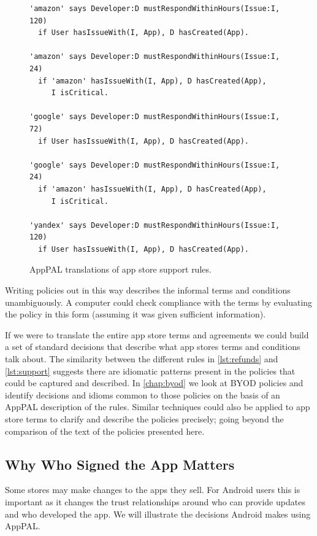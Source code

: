 \documentclass[thesis.tex]{subfiles}
\begin{document}
\begin{figure}\centering
  \begin{lstlisting}
'amazon' says Developer:D mustRespondWithinHours(Issue:I, 120)
  if User hasIssueWith(I, App), D hasCreated(App).

'amazon' says Developer:D mustRespondWithinHours(Issue:I, 24)
  if 'amazon' hasIssueWith(I, App), D hasCreated(App),
     I isCritical.
     
'google' says Developer:D mustRespondWithinHours(Issue:I, 72)
  if User hasIssueWith(I, App), D hasCreated(App).

'google' says Developer:D mustRespondWithinHours(Issue:I, 24)
  if 'amazon' hasIssueWith(I, App), D hasCreated(App),
     I isCritical.

'yandex' says Developer:D mustRespondWithinHours(Issue:I, 120)
  if User hasIssueWith(I, App), D hasCreated(App).
  \end{lstlisting}
  \caption{AppPAL translations of app store support rules.}
  \label{lst:support}
\end{figure}

Writing policies out in this way describes the informal terms and conditions
unambiguously. A computer could check compliance with the terms by evaluating
the policy in this form (assuming it was given sufficient information).

If we were to translate the entire app store terms and agreements we could build
a set of standard decisions that describe what app stores terms and conditions
talk about. The similarity between the different rules in \autoref{lst:refunds}
and \autoref{lst:support} suggests there are idiomatic patterns present in the
policies that could be captured and described. In \autoref{chap:byod} we look at
BYOD policies and identify decisions and idioms common to those policies on the
basis of an AppPAL description of the rules. Similar techniques could also be
applied to app store terms to clarify and describe the policies precisely; going
beyond the comparison of the text of the policies presented here.

\subsection{Why Who Signed the App Matters}
\label{ssec:signing}

Some stores may make changes to the apps they sell. For Android users this is
important as it changes the trust relationships around who can provide updates
and who developed the app. We will illustrate the decisions Android makes using
AppPAL.
\end{document}
